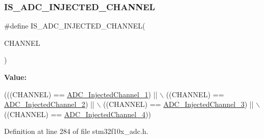 \subsubsection{\texorpdfstring{I\+S\+\_\+\+A\+D\+C\+\_\+\+I\+N\+J\+E\+C\+T\+E\+D\+\_\+\+C\+H\+A\+N\+N\+EL}{IS\_ADC\_INJECTED\_CHANNEL}}
{\footnotesize\ttfamily \#define I\+S\+\_\+\+A\+D\+C\+\_\+\+I\+N\+J\+E\+C\+T\+E\+D\+\_\+\+C\+H\+A\+N\+N\+EL(\begin{DoxyParamCaption}\item[{}]{C\+H\+A\+N\+N\+EL }\end{DoxyParamCaption})}

{\bfseries Value\+:}
\begin{DoxyCode}
(((CHANNEL) == \hyperlink{group___a_d_c__injected__channel__selection_ga8792d4ae0fa82dd317252c72815684ba}{ADC\_InjectedChannel\_1}) || \(\backslash\)
                                          ((CHANNEL) == \hyperlink{group___a_d_c__injected__channel__selection_ga2e322fccc7de16a0e79be573f5b1211c}{ADC\_InjectedChannel\_2}) || \(\backslash\)
                                          ((CHANNEL) == \hyperlink{group___a_d_c__injected__channel__selection_ga6bf03d805645b942bdcc53504e772cf1}{ADC\_InjectedChannel\_3}) || \(\backslash\)
                                          ((CHANNEL) == \hyperlink{group___a_d_c__injected__channel__selection_ga31d18bbcfa7b685e90c3a1313d9c6406}{ADC\_InjectedChannel\_4}))
\end{DoxyCode}


Definition at line 284 of file stm32f10x\+\_\+adc.\+h.

